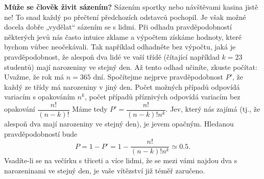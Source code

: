 \wikitextrule
\begin{example}\label{mai:exam063}
  \textbf{Může se člověk živit sázením?}\newline\small
  Sázením sportky nebo návštěvami kasina jistě ne! To snad každý po přečtení předchozích odstavců 
  pochopil. Je však možné docela dobře „vydělat“ sázením se s lidmi. Při odhadu pravděpodobností 
  některých jevů nás často intuice zklame a výpočtem získáme hodnoty, které bychom vůbec 
  neočekávali. Tak například odhadněte bez výpočtu, jaká je pravděpodobnost, že alespoň dva lidé ve 
  vaší třídě (čítající například \(k = 23\) studentů) mají narozeniny ve stejný den. Až tento odhad 
  učiníte, zkuste počítat: Uvažme, že rok má \(n = 365\) dní. Spočítejme nejprve pravděpodobnost 
  \(P'\), že každý ze třídy má narozeniny v jiný den. Počet možných případů odpovídá variacím s 
  opakováním \(n^k\), počet případů příznivých odpovídá variacím bez opakování 
  \(\dfrac{n!}{(n-k)!}\) Máme tedy \(P'=\dfrac{n!}{(n-k)!n^k}\). Jev, který nás zajímá (tj., že 
  alespoň dva mají narozeniny ve stejný den), je jevem opačným. Hledanou pravděpodobností bude
  \begin{equation*}
    P  = 1 - P' = 1 - \dfrac{n!}{(n - k)!n^k} \simeq \num{0.5}.
  \end{equation*}
  Vsadíte-li se na večírku s třiceti a více lidmi, že se mezi vámi najdou dva s narozeninami ve 
  stejný den, je vaše vítězství již téměř zaručeno.
\normalsize
\end{example}